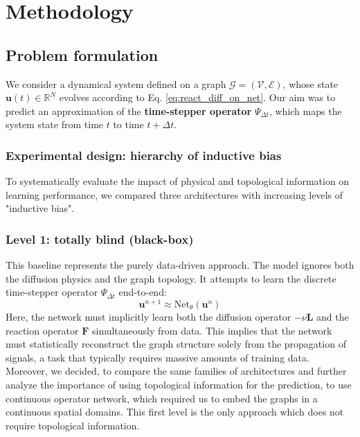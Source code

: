 \section{Methodology}

\subsection{Problem formulation}
We consider a dynamical system defined on a graph $\mathcal{G} = (\mathcal{V}, \mathcal{E})$, whose state $\mathbf{u}(t) \in \mathbb{R}^N$ evolves
according to Eq. \eqref{eq:react_diff_on_net}. 
Our aim was to predict an approximation of the \textbf{time-stepper operator} $\Psi_{\Delta t}$, which maps the system state from time $t$ to time $t + \Delta t$.


\subsubsection{Experimental design: hierarchy of inductive bias}
\label{sec:exp_design}
To systematically evaluate the impact of physical and topological information on learning performance, we compared three architectures with increasing levels of "inductive bias".

\subsubsection{Level 1: totally blind (black-box)}
This baseline represents the purely data-driven approach. The model ignores both the diffusion physics and the graph topology. It attempts to learn the discrete time-stepper operator $\Psi_{\Delta t}$ end-to-end:
\begin{equation}
    \mathbf{u}^{n+1} \approx \text{Net}_{\theta}(\mathbf{u}^n)
\end{equation}
Here, the network must implicitly learn both the diffusion operator $-\nu \mathbf{L}$ and the reaction operator $\mathbf{F}$ simultaneously from data. This implies that the network must statistically reconstruct the graph structure solely from the propagation of signals, a task that typically requires massive amounts of training data. Moreover, we decided, to compare the same families of architectures and further analyze the importance of using topological information for the prediction, to use continuous operator network, which required us to embed the graphs in a continuous spatial domains. This first level is the only approach which does not require topological information.

